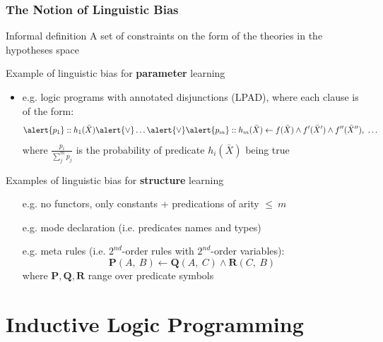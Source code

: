 \documentclass[presentation]{beamer}\mode<presentation>{\usetheme{AMSBolognaFC}}
\begin{document}
\begin{frame}[allowframebreaks]
    \frametitle{The Notion of Linguistic Bias}

    \begin{block}{Informal definition}
        A set of constraints on the form of the theories in the hypotheses space
    \end{block}

    \begin{exampleblock}{Example of linguistic bias for \textbf{parameter} learning}
        \begin{itemize}
            \item e.g. \alert{logic programs with annotated disjunctions} (LPAD), where each clause is of the form:
            \[ \alert{p_1} :: h_1(\bar{X}) \alert{\vee} \ldots \alert{\vee} \alert{p_m} :: h_m(\bar{X}) \leftarrow f(\bar{X}) \wedge f'(\bar{X}') \wedge f''(\bar{X}''),\ \ldots \]
            where $\frac{p_i}{\sum_j^{m} p_j}$ is the probability of predicate $h_i(\bar{X})$ being true
        \end{itemize}
    \end{exampleblock}

    \begin{exampleblock}{Examples of linguistic bias for \textbf{structure} learning}
        \begin{itemize}
            \item[e.g.] no functors, only constants + predications of arity $\leq ~ m$
            \item[e.g.] mode declaration (i.e. predicates names and types)
            \item[e.g.] meta rules (i.e. $2^{nd}$-order rules with $2^{nd}$-order variables):
            \[ \mathbf{P}(A,\ B) \leftarrow \mathbf{Q}(A,\ C) \wedge \mathbf{R}(C,\ B) \]
            where $\mathbf{P}, \mathbf{Q}, \mathbf{R}$ range over predicate symbols
        \end{itemize}
    \end{exampleblock}
\end{frame}

\section{Inductive Logic Programming}
\end{document}
